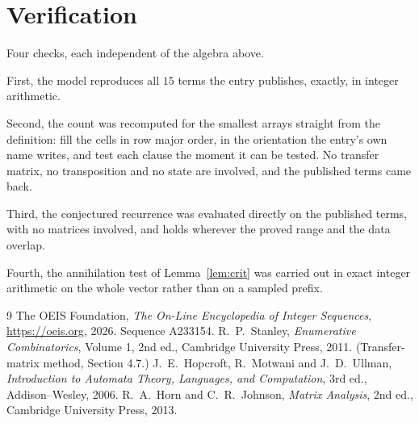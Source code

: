 \documentclass[11pt,a4paper]{article}
\theoremstyle{plain}
\theoremstyle{definition}
\begin{document}
\section{Verification}

Four checks, each independent of the algebra above.

First, the model reproduces all $15$ terms the entry publishes, exactly, in integer
arithmetic.

Second, the count was recomputed for the smallest arrays straight from the definition: fill the
cells in row major order, in the orientation the entry's own name writes, and test each clause
the moment it can be tested. No transfer matrix, no transposition and no state are involved,
and the published terms came back.

Third, the conjectured recurrence was evaluated directly on the published terms, with no
matrices involved, and holds wherever the proved range and the data overlap.

Fourth, the annihilation test of Lemma~\ref{lem:crit} was carried out in exact integer
arithmetic on the whole vector rather than on a sampled prefix.

\begin{thebibliography}{9}
 The OEIS Foundation, \emph{The On-Line Encyclopedia of Integer
Sequences}, \url{https://oeis.org}, 2026. Sequence A233154.
 R.~P.~Stanley, \emph{Enumerative Combinatorics}, Volume 1, 2nd ed.,
Cambridge University Press, 2011. (Transfer-matrix method, Section 4.7.)
 J.~E.~Hopcroft, R.~Motwani and J.~D.~Ullman, \emph{Introduction to Automata
Theory, Languages, and Computation}, 3rd ed., Addison--Wesley, 2006.
 R.~A.~Horn and C.~R.~Johnson, \emph{Matrix Analysis}, 2nd ed., Cambridge
University Press, 2013.
\end{thebibliography}
\end{document}
